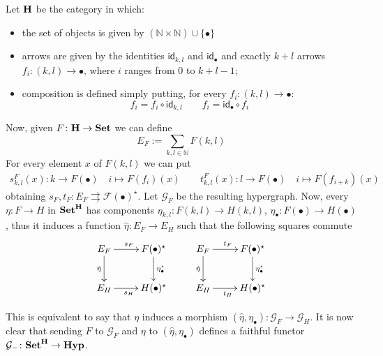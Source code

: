 \documentclass[runningheads,envcountsect]{llncs}
\newcommand{\catname}[1]{\textbf{\textup{#1}}}
\newcommand{\hyp}{\catname{Hyp}}
\newcommand{\id}[1]{\mathsf{id}_{#1}}
\begin{document}
\begin{definition}Let $\catname{H}$ be the category in which:
	\begin{itemize}
		\item the set of objects is given by $ (\mathbb{N}\times \mathbb{N}) \cup \{\bullet\}$
		\item arrows are given by the identities $\id{k,l}$ and $\id{\bullet}$ and exactly $k+l$ arrows $f_i\colon (k,l)\rightarrow \bullet$, where $i$ ranges from $0$ to $k+l-1$;
		\item composition is defined simply putting, for every $f_i\colon (k,l)\rightarrow \bullet$:
		\begin{equation*}
			f_i=f_i\circ \id{k,l} \qquad f_i = \id{\bullet}\circ f_i 
		\end{equation*}
	\end{itemize}
\end{definition}

Now, given $F\colon \catname{H}\to \catname{Set}$ we can define
\[E_F:=\sum_{k,l\in \mathbb{N}}F(k,l)\]
For every element $x$ of $F(k,l)$ we can put
\begin{align*}
	s^F_{k,l}(x)\colon k\to F(\bullet) \quad i \mapsto F(f_i)(x)\qquad 
	t^F_{k,l}(x)\colon l\to F(\bullet) \quad i \mapsto F(f_{i+k})(x)
\end{align*}
obtaining
$s_F, t_F\colon E_F\rightrightarrows \mathcal{F}(\bullet)^{\star}$. Let $\mathcal{G}_F$ be the resulting hypergraph. Now, every $\eta\colon F\rightarrow H$ in $\catname{Set}^{\catname{H}}$ has components $\eta_{k,l}\colon F(k,l)\to H(k,l)$, $\eta_{\bullet}\colon F(\bullet)\to H(\bullet)$, thus it induces a function $\hat{\eta}\colon E_F\rightarrow E_H$ such that the following squares commute
\[\xymatrix{ E_F \ar[r]^{s_F} \ar[d]_{\hat{\eta}}& F(\bullet)^\star \ar[d]^{\eta^\star_\bullet} & E_F \ar[r]^{t_F} \ar[d]_{\hat{\eta}} & F(\bullet)^\star \ar[d]^{\eta^\star_\bullet}\\ E_H \ar[r]_{s_H} & H(\bullet)^\star & E_H \ar[r]_{t_H}& H(\bullet)^\star}\]

This is equivalent to say that $\eta$ induces a morphism $(\hat{\eta}, \eta_{\bullet})\colon \mathcal{G}_F\to \mathcal{G}_H$. It is now clear that sending $F$ to $\mathcal{G}_F$ and $\eta$ to $(\hat{\eta}, \eta_{\bullet})$ defines a faithful functor $\mathcal{G}_{-}\colon \catname{Set}^{\catname{H}}\to \hyp$.
\end{document}
